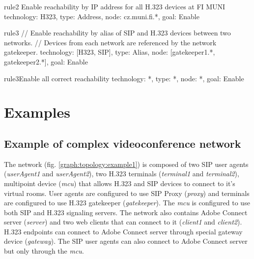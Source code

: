 \begin{TopologyExample}{rule2}
      {Enable reachability by IP address for all H.323 devices at FI MUNI}
technology: H323,
type: Address,
node: cz.muni.fi.*,
goal: Enable
\end{TopologyExample}

\begin{TopologyExample}{rule3}{}
// Enable reachability by alias of SIP and H.323 devices between two networks.
// Devices from each network are referenced by the network gatekeeper.
technology: [H323, SIP],
type: Alias,
node: [gatekeeper1.*, gatekeeper2.*],
goal: Enable
\end{TopologyExample}

\begin{TopologyExample}{rule3}{Enable all correct reachability}
technology: *,
type: *,
node: *,
goal: Enable
\end{TopologyExample}


\section{Examples}

\subsection{Example of complex videoconference network}

The network (fig. \ref{graph:topology:example1}) is composed of two SIP user 
agents (\emph{userAgent1} and \emph{userAgent2}), two H.323 terminals 
(\emph{terminal1} and \emph{terminal2}), multipoint device (\emph{mcu}) that 
allows H.323 and SIP devices to connect to it's virtual rooms. User agents 
are configured to use SIP Proxy (\emph{proxy}) and terminals are configured 
to use H.323 gatekeeper (\emph{gatekeeper}). The \emph{mcu} is configured to 
use both SIP and H.323 signaling servers. The network also contains Adobe 
Connect server (\emph{server}) and two web clients that can connect to it 
(\emph{client1} and \emph{client2}). H.323 endpoints can connect to Adobe 
Connect server through special gateway device (\emph{gateway}). The SIP user 
agents can also connect to Adobe Connect server but only through the 
\emph{mcu}.

